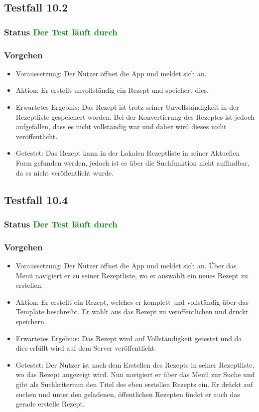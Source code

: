 \subsection{Testfall 10.2}
\subsubsection{Status \textcolor{green}{ Der Test läuft durch} }
\subsubsection{Vorgehen}
\begin{itemize}
\item Voraussetzung: Der Nutzer öffnet die App und meldet sich an.
\item Aktion:  Er erstellt unvollständig ein Rezept und speichert dies.
\item Erwartetes Ergebnis:  Das Rezept ist trotz seiner Unvollständigkeit in der Rezeptliste gespeichert worden. Bei der Konvertierung des Rezeptes ist jedoch aufgefallen, dass es nicht vollständig war und daher wird dieses nicht veröffentlicht. 
\item Getestet: Das Rezept kann in der Lokalen Rezeptliste in seiner Aktuellen Form gefunden werden, jedoch ist es über die Suchfunktion nicht auffindbar, da es nicht veröffentlicht wurde. 
\end{itemize}


\subsection{Testfall 10.4}
\subsubsection{Status \textcolor{green}{ Der Test läuft durch} }
\subsubsection{Vorgehen}
\begin{itemize}
\item Voraussetzung: Der Nutzer öffnet die App und meldet sich an. Über das Menü navigiert er zu seiner Rezeptliste, wo er auswählt ein neues Rezept zu erstellen.
\item Aktion:  Er erstellt ein Rezept, welches er komplett und vollständig über das Template beschreibt. Er wählt aus das Rezept zu veröffentlichen und drückt speichern.
\item Erwartetes Ergebnis: Das Rezept wird auf Vollständigkeit getestet und da dies erfüllt wird auf dem Server veröffentlicht. 
\item Getestet: Der Nutzer ist nach dem Erstellen des Rezepts in seiner Rezeptliste, wo das Rezept angezeigt wird. Nun navigiert er über das Menü zur Suche und gibt als Suchkriterium den Titel des eben erstellen Rezepts ein. Er drückt auf suchen und unter den geladenen, öffentlichen Rezepten findet er auch das gerade erstelle Rezept. 
\end{itemize}

